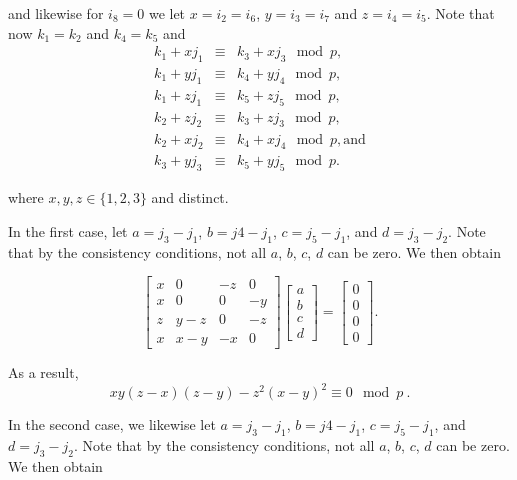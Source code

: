 and likewise for $i_8=0$ we let $x=i_2=i_6$, $y=i_3=i_7$ and
$z=i_4=i_5$. Note that now $k_1=k_2$ and $k_4=k_5$ and
\begin{eqnarray*}
k_1+xj_1 &\equiv& k_3+xj_3 \mod p, \\
k_1+yj_1 &\equiv& k_4+yj_4 \mod p, \\
k_1+zj_1 &\equiv& k_5+zj_5 \mod p, \\
k_2+zj_2 &\equiv& k_3+zj_3 \mod p, \\
k_2+xj_2 &\equiv& k_4+xj_4 \mod p, \text{and}\\
k_3+yj_3 &\equiv& k_5+yj_5 \mod p.
\end{eqnarray*}

where $x,y,z\in \{1,2,3\}$ and distinct.

In the first case, let $a=j_3-j_1$, $b=j4-j_1$, $c=j_5-j_1$, and
$d=j_3-j_2$. Note that by the consistency conditions, not all $a$,
$b$, $c$, $d$ can be zero. We then obtain

\begin{equation}
\left[\begin{array}{ccccc}
x & 0 & -z & 0\\
x & 0 & 0 & -y\\
z & y-z&0 & -z\\
x & x-y & -x & 0
\end{array}
\right] \left[\begin{array}{c}a\\b\\c\\d\end{array} \right] =
\left[\begin{array}{c}0\\0\\0\\0\end{array} \right].
\end{equation}

As a result,
\begin{equation}\label{eq5a}
xy(z-x)(z-y)-z^2(x-y)^2 \equiv 0 \mod p~.
\end{equation}

In the second case, we likewise let $a=j_3-j_1$, $b=j4-j_1$,
$c=j_5-j_1$, and $d=j_3-j_2$. Note that by the consistency
conditions, not all $a$, $b$, $c$, $d$ can be zero. We then obtain

